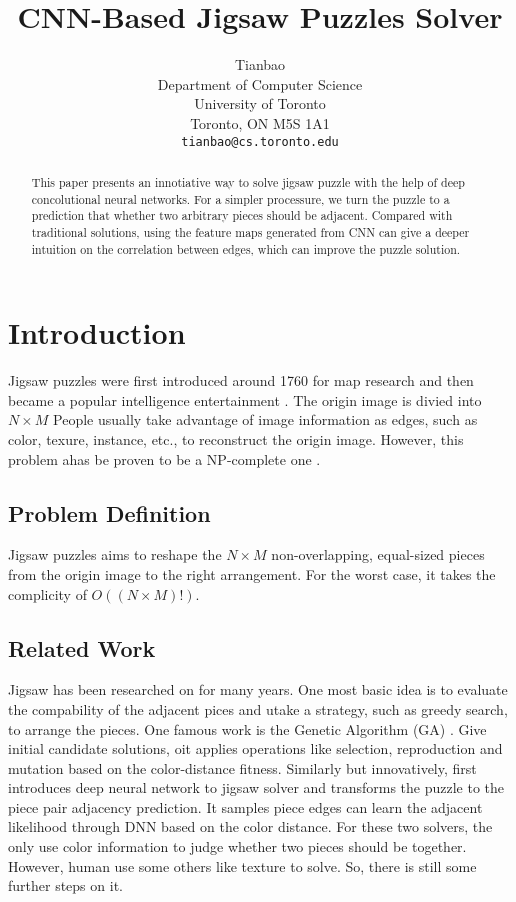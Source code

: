 \documentclass{article}
\title{CNN-Based Jigsaw Puzzles Solver}
\author{Tianbao\\
  Department of Computer Science\\
  University of Toronto\\
  Toronto, ON M5S 1A1 \\
  \texttt{tianbao@cs.toronto.edu} \\
}
\begin{document}

\maketitle

\begin{abstract}

This paper presents an innotiative way to solve jigsaw puzzle with the help of deep concolutional neural networks. For a simpler processure, we turn the puzzle to a prediction that whether two arbitrary pieces should be adjacent. Compared with traditional solutions, using the feature maps generated from CNN can give a deeper intuition on the correlation between edges, which can improve the puzzle solution.

\end{abstract}

\section{Introduction}

Jigsaw puzzles were first introduced around 1760 for map research and then became a popular intelligence entertainment \cite{freeman1964apictorial}. The origin image is divied into $N\times M$
People usually take advantage of image information as edges, such as color, texure, instance, etc., to reconstruct the origin image. However, this problem ahas be proven to be a NP-complete one \cite{altman1989solving,demaine2007jigsaw}.

\subsection{Problem Definition}

Jigsaw puzzles aims to reshape the $N\times M$ non-overlapping, equal-sized pieces from the origin image to the right arrangement. For the worst case, it takes the complicity of $O((N\times M)!)$.

\subsection{Related Work}

Jigsaw has been researched on for many years. One most basic idea is to evaluate the compability of the adjacent pices and utake a strategy, such as greedy search, to arrange the pieces. One famous work is the Genetic Algorithm (GA) \cite{sholomon2013genetic}. Give initial candidate solutions, oit applies operations like selection, reproduction and mutation based on the color-distance fitness. Similarly but innovatively, \cite{sholomon2016dnn} first introduces deep neural network to jigsaw solver and transforms the puzzle to the piece pair adjacency prediction. It samples piece edges can learn the adjacent likelihood through DNN based on the color distance. For these two solvers, the only use color information to judge whether two pieces should be together. However, human use some others like texture to solve. So, there is still some further steps on it.
\end{document}
